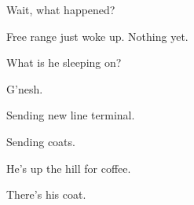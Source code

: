 

Wait, what happened?

Free range just woke up.  Nothing yet.

What is he sleeping on?

G'nesh.

Sending new line terminal.

Sending coats.

He's up the hill for coffee.

There's his coat.

\bye
